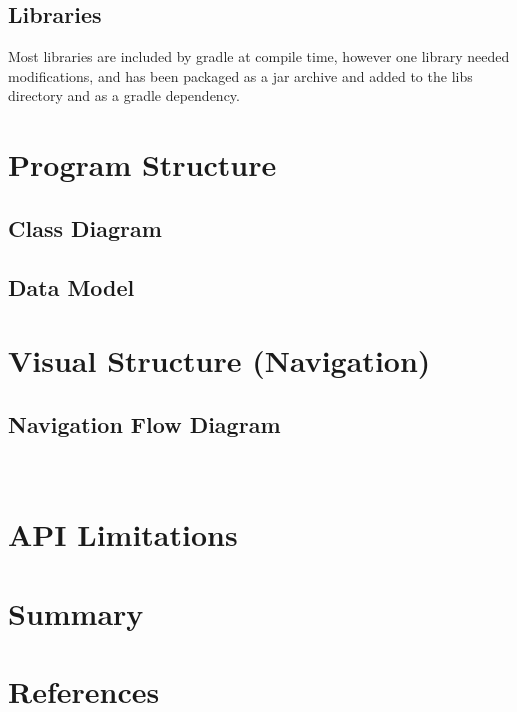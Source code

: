 \documentclass[11pt,english,numbers=endperiod,parskip=half]{scrartcl}
\begin{document}
  \subsection{Libraries}
  Most libraries are included by gradle at compile time, however one library
  needed modifications, and has been packaged as a jar archive and added
  to the libs directory and as a gradle dependency.

\section{Program Structure}
  \subsection{Class Diagram}
  \subsection{Data Model}

\section{Visual Structure (Navigation)}
  \subsection{Navigation Flow Diagram}
    \begin{figure}[H]
      \\
    \end{figure}

\section{API Limitations}

\section{Summary}
\section{References}
\end{document}
